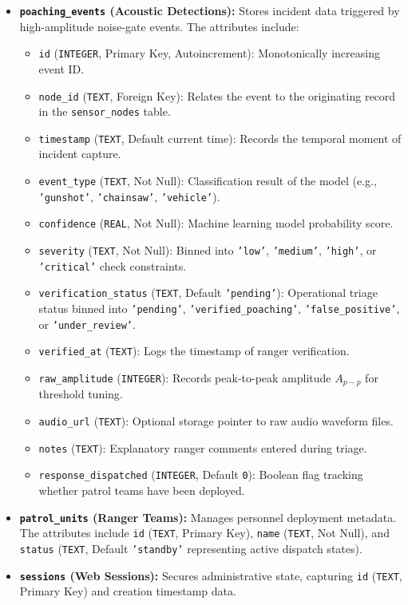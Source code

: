 \documentclass[11pt,a4paper,oneside]{report}
\begin{document}
\begin{itemize}
    \item \textbf{\texttt{poaching\_events} (Acoustic Detections):} Stores incident data triggered by high-amplitude noise-gate events. The attributes include:
    \begin{itemize}
        \item \texttt{id} (\texttt{INTEGER}, Primary Key, Autoincrement): Monotonically increasing event ID.
        \item \texttt{node\_id} (\texttt{TEXT}, Foreign Key): Relates the event to the originating record in the \texttt{sensor\_nodes} table.
        \item \texttt{timestamp} (\texttt{TEXT}, Default current time): Records the temporal moment of incident capture.
        \item \texttt{event\_type} (\texttt{TEXT}, Not Null): Classification result of the model (e.g., \texttt{'gunshot'}, \texttt{'chainsaw'}, \texttt{'vehicle'}).
        \item \texttt{confidence} (\texttt{REAL}, Not Null): Machine learning model probability score.
        \item \texttt{severity} (\texttt{TEXT}, Not Null): Binned into \texttt{'low'}, \texttt{'medium'}, \texttt{'high'}, or \texttt{'critical'} check constraints.
        \item \texttt{verification\_status} (\texttt{TEXT}, Default \texttt{'pending'}): Operational triage status binned into \texttt{'pending'}, \texttt{'verified\_poaching'}, \texttt{'false\_positive'}, or \texttt{'under\_review'}.
        \item \texttt{verified\_at} (\texttt{TEXT}): Logs the timestamp of ranger verification.
        \item \texttt{raw\_amplitude} (\texttt{INTEGER}): Records peak-to-peak amplitude $A_{p-p}$ for threshold tuning.
        \item \texttt{audio\_url} (\texttt{TEXT}): Optional storage pointer to raw audio waveform files.
        \item \texttt{notes} (\texttt{TEXT}): Explanatory ranger comments entered during triage.
        \item \texttt{response\_dispatched} (\texttt{INTEGER}, Default \texttt{0}): Boolean flag tracking whether patrol teams have been deployed.
    \end{itemize}

    \item \textbf{\texttt{patrol\_units} (Ranger Teams):} Manages personnel deployment metadata. The attributes include \texttt{id} (\texttt{TEXT}, Primary Key), \texttt{name} (\texttt{TEXT}, Not Null), and \texttt{status} (\texttt{TEXT}, Default \texttt{'standby'} representing active dispatch states).
    \item \textbf{\texttt{sessions} (Web Sessions):} Secures administrative state, capturing \texttt{id} (\texttt{TEXT}, Primary Key) and creation timestamp data.
\end{itemize}
\end{document}
